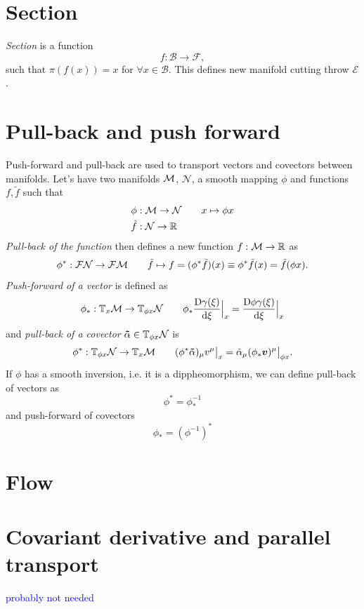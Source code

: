 \section{Section}
\label{sec:section}
\emph{Section} is a function
$$f:\mathcal{B}\rightarrow \mathcal{F},$$
such that $\pi(f(x))=x$ for $\forall x\in \mathcal{B}$. This defines new manifold cutting throw $\mathcal{E}$.


\section{Pull-back and push forward}
Push-forward and pull-back are used to transport vectors and covectors between manifolds. Let's have two manifolds $\mathcal{M}$, $\mathcal{N}$, a smooth mapping $\phi$ and functions $f,\tilde f$ such that
\begin{align*}
    \phi&:\mathcal{M}\rightarrow \mathcal{N}\qquad x\mapsto \phi x\\
    \tilde f&:\mathcal{N}\rightarrow \mathbb{R} 
\end{align*}
\emph{Pull-back of the function} then defines a new function $
f:\mathcal{M}\rightarrow \mathbb{R} $ as
$$\phi^*:\mathcal{F} \mathcal{N}\rightarrow \mathcal{F}\mathcal{M} \qquad  \tilde f\mapsto f=(\phi^*\tilde f)(x)\equiv \phi^*\tilde f(x) =\tilde f(\phi x).$$
\emph{Push-forward of a vector} is defined as
$$\phi_*: \mathbb{T}_x\mathcal{M} \rightarrow \mathbb{T}_{\phi x}\mathcal N\qquad \phi_* 
\frac{\mathrm{D} \gamma(\xi)}{\mathrm{d} \xi}\Big|_x=\frac{\mathrm{D} \phi \gamma(\xi)}{\mathrm{d} \xi}\Big|_x$$
and \emph{pull-back of a covector} $\bm\tilde\alpha\in \mathbb{T}_{\phi x}\mathcal N$ is
$$\phi^*: \mathbb{T}_{\phi x}\mathcal N\rightarrow \mathbb{T}_x\mathcal{M}  \qquad (\phi^*\bm \tilde\alpha)_\mu v^\mu\big|_x= \tilde\alpha_\mu (\phi_* \bm v)^\mu\big|_{\phi x}.$$
If $\phi$ has a smooth inversion, i.e. it is a dippheomorphism, we can define pull-back of vectors as
\begin{equation}
    \phi^*=\phi_*^{-1}
\end{equation}
and push-forward of covectors
\begin{equation}
    \phi_*=(\phi^{-1})^*
\end{equation}

\section{Flow}
\section{Covariant derivative and parallel transport}
\textcolor{blue}{probably not needed}


